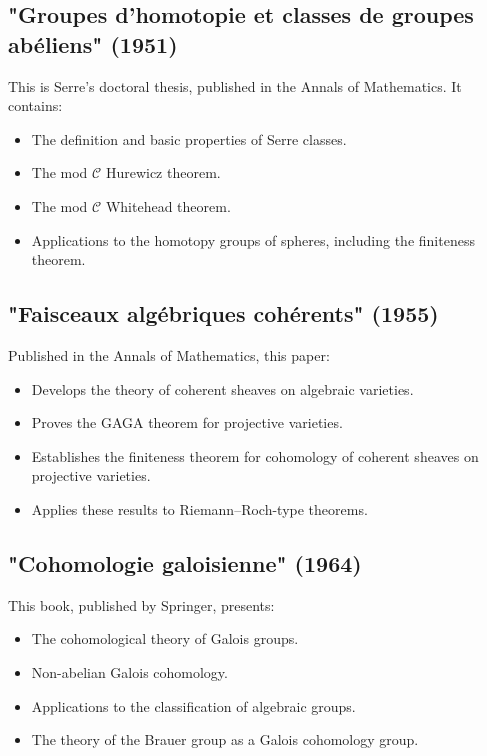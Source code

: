\subsection{"Groupes d'homotopie et classes de groupes abéliens" (1951)}

This is Serre's doctoral thesis, published in the Annals of Mathematics. It contains:
\begin{itemize}
\item The definition and basic properties of Serre classes.
\item The mod $\mathcal{C}$ Hurewicz theorem.
\item The mod $\mathcal{C}$ Whitehead theorem.
\item Applications to the homotopy groups of spheres, including the finiteness theorem.
\end{itemize}

\subsection{"Faisceaux algébriques cohérents" (1955)}

Published in the Annals of Mathematics, this paper:
\begin{itemize}
\item Develops the theory of coherent sheaves on algebraic varieties.
\item Proves the GAGA theorem for projective varieties.
\item Establishes the finiteness theorem for cohomology of coherent sheaves on projective varieties.
\item Applies these results to Riemann--Roch-type theorems.
\end{itemize}

\subsection{"Cohomologie galoisienne" (1964)}

This book, published by Springer, presents:
\begin{itemize}
\item The cohomological theory of Galois groups.
\item Non-abelian Galois cohomology.
\item Applications to the classification of algebraic groups.
\item The theory of the Brauer group as a Galois cohomology group.
\end{itemize}

